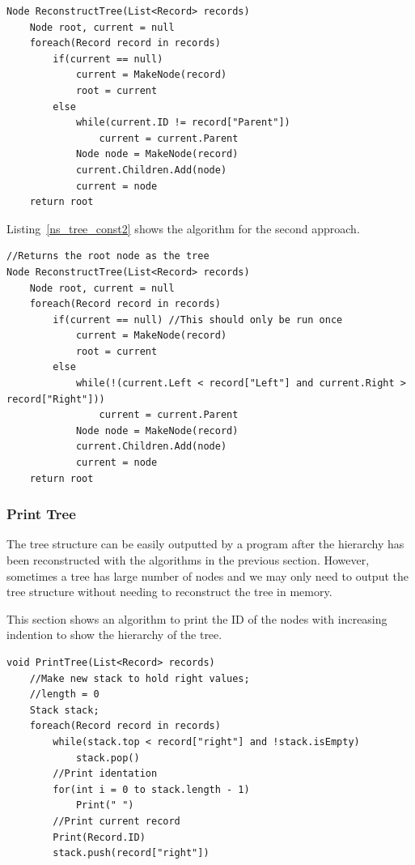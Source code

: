 \begin{lstlisting}[caption={Tree reconstruction using Parent},label=ns_tree_const1]
Node ReconstructTree(List<Record> records)
	Node root, current = null
	foreach(Record record in records)
		if(current == null)
			current = MakeNode(record)
			root = current
		else
			while(current.ID != record["Parent"])
				current = current.Parent
			Node node = MakeNode(record)
			current.Children.Add(node)
			current = node
	return root
\end{lstlisting}

Listing~\ref{ns_tree_const2} shows the algorithm for the second approach.

\begin{lstlisting}[caption={Tree reconstruction using Left and Right value},label=ns_tree_const2]
//Returns the root node as the tree
Node ReconstructTree(List<Record> records)
	Node root, current = null
	foreach(Record record in records)
		if(current == null) //This should only be run once
			current = MakeNode(record)
			root = current
		else
			while(!(current.Left < record["Left"] and current.Right > record["Right"]))
				current = current.Parent
			Node node = MakeNode(record)
			current.Children.Add(node)
			current = node
	return root
\end{lstlisting}	

\subsubsection{Print Tree}

The tree structure can be easily outputted by a program after the hierarchy has been reconstructed with the algorithms in the previous section. However, sometimes a tree has large number of nodes and we may only need to output the tree structure without needing to reconstruct the tree in memory.

This section shows an algorithm to print the ID of the nodes with increasing indention to show the hierarchy of the tree.

\begin{lstlisting}[caption={Tree reconstruction using Left and Right value},label=ns_print_tree]
void PrintTree(List<Record> records)
	//Make new stack to hold right values; 
	//length = 0
	Stack stack;
	foreach(Record record in records)
		while(stack.top < record["right"] and !stack.isEmpty)
			stack.pop()
		//Print identation
		for(int i = 0 to stack.length - 1) 
			Print(" ")
		//Print current record
		Print(Record.ID)
		stack.push(record["right"])
\end{lstlisting}
